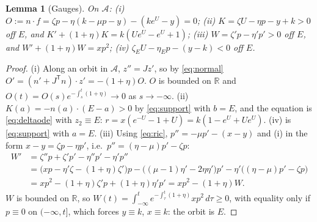 \documentclass[11pt,a4paper]{article}
\numberwithin{equation}{section}
\newtheorem{lemma}[theorem]{Lemma}
\theoremstyle{remark}\newtheorem{remark}[theorem]{Remark}
\newcommand{\R}{\mathbb R}
\newcommand{\cA}{\mathcal A}
\begin{document}
\begin{lemma}[Gauges]\label{lem:gauges}
On $\cA$: \textup{(i)} $O:=n\cdot f=\zeta p-\eta(k-\mu p-y)-(ke^{U}-y)=0$;
\textup{(ii)} $K=\zeta U-\eta p-y+k>0$ off $E$, and $K'+(1+\eta)K=k(Ue^{U}-e^{U}+1)$;
\textup{(iii)} $W=\zeta'p-\eta'p'>0$ off $E$, and $W'+(1+\eta)W=xp^2$;
\textup{(iv)} $\zeta_EU-\eta_Ep-(y-k)<0$ off $E$.
\end{lemma}
\begin{proof}
(i) Along an orbit in $\cA$, $z''=Jz'$, so by \eqref{eq:normal} $O'=(n'+J^{\mathsf T}n)\cdot z'=-(1+\eta)O$. $O$ is
bounded on $\R$ and $O(t)=O(s)e^{-\int_s^t(1+\eta)}\to0$ as $s\to-\infty$. (ii) $K(a)=-n(a)\cdot(E-a)>0$ by
\eqref{eq:support} with $b=E$, and the equation is \eqref{eq:deltaode} with $z_2\equiv E$:
$r=x(e^{-U}-1+U)=k(1-e^{U}+Ue^{U})$. (iv) is \eqref{eq:support} with $a=E$. (iii) Using \eqref{eq:ric}, $p''=-\mu
p'-(x-y)$ and (i) in the form $x-y=\zeta p-\eta p'$, i.e.\ $p''=(\eta-\mu)p'-\zeta p$:
\begin{align*}
W'&=\zeta''p+\zeta'p'-\eta''p'-\eta'p''\\
&=\bigl(xp-\eta'\zeta-(1+\eta)\zeta'\bigr)p-\bigl((\mu-1)\eta'-2\eta\eta'\bigr)p'-\eta'\bigl((\eta-\mu)p'-\zeta p\bigr)\\
&=xp^2-(1+\eta)\zeta'p+(1+\eta)\eta'p'=xp^2-(1+\eta)W .
\end{align*}
$W$ is bounded on $\R$, so $W(t)=\int_{-\infty}^te^{-\int_\tau^t(1+\eta)}xp^2\,d\tau\ge0$, with equality only if
$p\equiv0$ on $(-\infty,t]$, which forces $y\equiv k$, $x\equiv k$: the orbit is $E$.
\end{proof}
\end{document}
